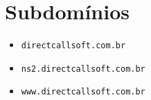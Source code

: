 
\section{Subdomínios}
\begin{multicols}{2}  %
\begin{itemize}
\item \texttt{directcallsoft.com.br}\item \texttt{ns2.directcallsoft.com.br}\item \texttt{www.directcallsoft.com.br}
\end{itemize}
\end{multicols}
